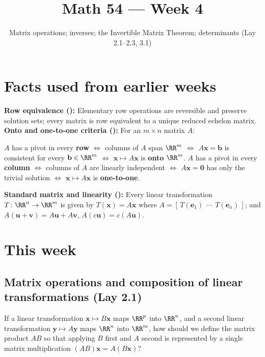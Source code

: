 \documentclass[10pt]{scrartcl}
\title{Math 54 --- Week 4}
\subtitle{Matrix operations; inverses; the Invertible Matrix Theorem; determinants (Lay 2.1--2.3, 3.1)}
\author{}\date{}\ihead{}
\newcommand{\vv}[1]{\mathbf{#1}}
\begin{document}
\maketitle

\section{Facts used from earlier weeks}
\begin{enumerate}[label=(W\arabic*),leftmargin=2.8em,itemsep=4pt]
  \ii {}\textbf{Row equivalence ():} Elementary row operations are reversible and preserve solution sets; every matrix is row equivalent to a unique reduced echelon matrix.
  \ii {}\textbf{Onto and one-to-one criteria ():} For an $m\times n$ matrix $A$:
  \begin{itemize}
    \ii $A$ has a pivot in every \textbf{row} $\iff$ columns of $A$ span $\RR^m$ $\iff$ $A\vv x=\vv b$ is consistent for every $\vv b\in\RR^m$ $\iff$ $\vv x\mapsto A\vv x$ is \textbf{onto} $\RR^m$.
    \ii $A$ has a pivot in every \textbf{column} $\iff$ columns of $A$ are linearly independent $\iff$ $A\vv x=\vv 0$ has only the trivial solution $\iff$ $\vv x\mapsto A\vv x$ is \textbf{one-to-one}.
  \end{itemize}
  \ii {}\textbf{Standard matrix and linearity ():} Every linear transformation $T\colon\RR^n\to\RR^m$ is given by $T(\vv x)=A\vv x$ where $A=[\,T(\vv e_1)\ \ \cdots\ \ T(\vv e_n)\,]$; and $A(\vv u+\vv v)=A\vv u+A\vv v$, $A(c\vv u)=c(A\vv u)$.
\end{enumerate}

\section{This week}

\subsection{Matrix operations and composition of linear transformations (Lay 2.1)}

\begin{qbox}
  If a linear transformation $\vv x\mapsto B\vv x$ maps $\RR^p$ into $\RR^n$, and a second linear transformation $\vv y\mapsto A\vv y$ maps $\RR^n$ into $\RR^m$, how should we define the matrix product $AB$ so that applying $B$ first and $A$ second is represented by a single matrix multiplication $(AB)\vv x = A(B\vv x)$?
\end{qbox}
\end{document}
